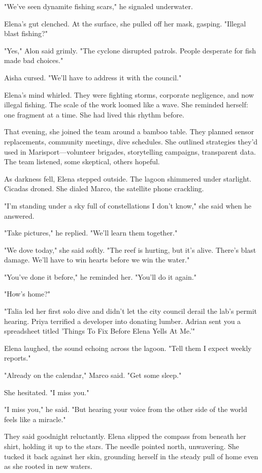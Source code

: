 "We've seen dynamite fishing scars," he signaled underwater.

Elena's gut clenched. At the surface, she pulled off her mask, gasping. "Illegal blast fishing?"

"Yes," Alon said grimly. "The cyclone disrupted patrols. People desperate for fish made bad choices."

Aisha cursed. "We'll have to address it with the council."

Elena's mind whirled. They were fighting storms, corporate negligence, and now illegal fishing. The scale of the work loomed like a wave. She reminded herself: one fragment at a time. She had lived this rhythm before.

That evening, she joined the team around a bamboo table. They planned sensor replacements, community meetings, dive schedules. She outlined strategies they'd used in Marisport—volunteer brigades, storytelling campaigns, transparent data. The team listened, some skeptical, others hopeful.

As darkness fell, Elena stepped outside. The lagoon shimmered under starlight. Cicadas droned. She dialed Marco, the satellite phone crackling.

"I'm standing under a sky full of constellations I don't know," she said when he answered.

"Take pictures," he replied. "We'll learn them together."

"We dove today," she said softly. "The reef is hurting, but it's alive. There's blast damage. We'll have to win hearts before we win the water."

"You've done it before," he reminded her. "You'll do it again."

"How's home?"

"Talia led her first solo dive and didn't let the city council derail the lab's permit hearing. Priya terrified a developer into donating lumber. Adrian sent you a spreadsheet titled 'Things To Fix Before Elena Yells At Me.'"

Elena laughed, the sound echoing across the lagoon. "Tell them I expect weekly reports."

"Already on the calendar," Marco said. "Get some sleep."

She hesitated. "I miss you."

"I miss you," he said. "But hearing your voice from the other side of the world feels like a miracle."

They said goodnight reluctantly. Elena slipped the compass from beneath her shirt, holding it up to the stars. The needle pointed north, unwavering. She tucked it back against her skin, grounding herself in the steady pull of home even as she rooted in new waters.

